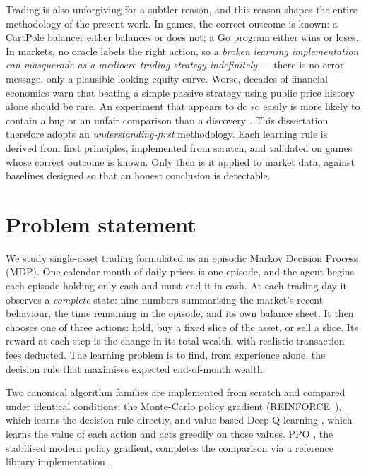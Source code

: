 Trading is also unforgiving for a subtler reason, and this reason shapes
the entire methodology of the present work. In games, the correct outcome
is known: a CartPole balancer either balances or does not; a Go program
either wins or loses. In markets, no oracle labels the right action, so a
\emph{broken learning implementation can masquerade as a mediocre trading
strategy indefinitely} --- there is no error message, only a plausible-looking
equity curve. Worse, decades of financial economics
\cite{fama1970} warn that beating a simple passive strategy using public
price history alone should be rare. An experiment that appears to do so
easily is more likely to contain a bug or an unfair comparison than a
discovery \cite{bailey2014}. This dissertation therefore adopts an
\emph{understanding-first} methodology. Each learning rule is derived from
first principles, implemented from scratch, and validated on games whose
correct outcome is known. Only then is it applied to market data, against
baselines designed so that an honest conclusion is detectable.

\section{Problem statement}
\label{sec:intro_problem}

We study single-asset trading formulated as an episodic Markov Decision
Process (MDP). One calendar month of daily prices is one episode, and the
agent begins each episode holding only cash and must end it in cash. At
each trading day it observes a \emph{complete} state: nine numbers
summarising the market's recent behaviour, the time remaining in the
episode, and its own balance sheet. It then chooses one of three actions:
hold, buy a fixed slice of the asset, or sell a slice. Its reward at each
step is the change in its total wealth, with realistic transaction fees
deducted. The learning problem is to find, from experience alone, the
decision rule that maximises expected end-of-month wealth.

Two canonical algorithm families are implemented from scratch and
compared under identical conditions: the Monte-Carlo policy gradient
(REINFORCE~\cite{williams1992}), which learns the decision rule directly,
and value-based Deep Q-learning \cite{mnih2015}, which learns the value
of each action and acts greedily on those values. PPO
\cite{schulman2017ppo}, the stabilised modern policy gradient, completes
the comparison via a reference library implementation
\cite{raffin2021sb3}.

